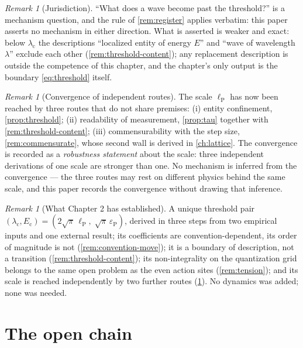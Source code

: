 \documentclass[11pt]{amsbook}
\theoremstyle{plain}
\theoremstyle{definition}
\theoremstyle{remark}
\newtheorem{remark}[theorem]{Remark}
\begin{document}
\begin{remark}[Jurisdiction]\label{rem:jurisdiction}
``What does a wave become past the threshold?'' is a mechanism question, and the rule of \cref{rem:register} applies verbatim: this paper asserts no mechanism in either direction. What is asserted is weaker and exact: below $\lambda_{\mathrm c}$ the descriptions ``localized entity of energy $E$'' and ``wave of wavelength $\lambda$'' exclude each other (\cref{rem:threshold-content}); any replacement description is outside the competence of this chapter, and the chapter's only output is the boundary \cref{eq:threshold} itself.
\end{remark}

\begin{remark}[Convergence of independent routes]\label{rem:convergence}
The scale $\ell_{\mathrm P}$ has now been reached by three routes that do not share premises: (i) entity confinement, \cref{prop:threshold}; (ii) readability of measurement, \cref{prop:tau} together with \cref{rem:threshold-content}; (iii) commensurability with the step size, \cref{rem:commensurate}, whose second wall is derived in \cref{ch:lattice}. The convergence is recorded as a \emph{robustness statement} about the scale: three independent derivations of one scale are stronger than one. No mechanism is inferred from the convergence --- the three routes may rest on different physics behind the same scale, and this paper records the convergence without drawing that inference.
\end{remark}

\begin{remark}[What Chapter 2 has established]\label{rem:ch2summary}
A unique threshold pair $(\lambda_{\mathrm c}, E_{\mathrm c}) = (2\sqrt{\pi}\,\ell_{\mathrm P},\; \sqrt{\pi}\,\varepsilon_{\mathrm P})$, derived in three steps from two empirical inputs and one external result; its coefficients are convention-dependent, its order of magnitude is not (\cref{rem:convention-move}); it is a boundary of description, not a transition (\cref{rem:threshold-content}); its non-integrality on the quantization grid belongs to the same open problem as the even action sites (\cref{rem:tension}); and its scale is reached independently by two further routes (\cref{rem:convergence}). No dynamics was added; none was needed.
\end{remark}

\part{The open chain}
\end{document}
